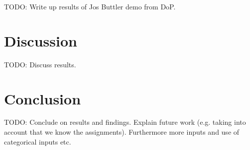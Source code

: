\documentclass[12pt,a4paper]{report}
\theoremstyle{definition}
\begin{document}
TODO: Write up results of Jos Buttler demo from DoP.

\chapter{Discussion}

TODO: Discuss results.

\chapter{Conclusion}

TODO: Conclude on results and findings. Explain future work (e.g. taking into account that we know the assignments). Furthermore more inputs and use of categorical inputs etc.

\end{document}

